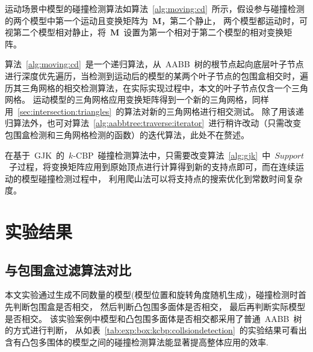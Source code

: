\begin{algorithm}[htb]
\end{algorithm}

运动场景中模型的碰撞检测算法如算法~\ref{alg:moving:cd}~所示，假设参与碰撞检测的两个模型中第一个运动且变换矩阵为~$\bm{M}$，第二个静止，
两个模型都运动时，可视第二个模型相对静止，将~$\bm{M}$~设置为第一个相对于第二个模型的相对变换矩阵。

算法~\ref{alg:moving:cd}~是一个递归算法，从~AABB~树的根节点起向底层叶子节点进行深度优先遍历，当检测到运动后的模型的某两个叶子节点的包围盒相交时，遍历其三角网格的相交检测算法，在实际实现过程中，本文的叶子节点仅含一个三角网格。
运动模型的三角网格应用变换矩阵得到一个新的三角网格，同样用~\ref{sec:intersection:triangles}~的算法对新的三角网格进行相交测试。
除了用该递归算法外，也可对算法~\ref{alg:aabbtree:traverse:iterator}~进行稍许改动（只需改变包围盒检测和三角网格检测的函数）的迭代算法，此处不在赘述。

在基于~GJK~的~$k$-CBP~碰撞检测算法中，只需要改变算法~\ref{alg:gjk}~中~$Support$~子过程，将变换矩阵应用到原始顶点进行计算得到新的支持点即可，而在连续运动的模型碰撞检测过程中，
利用爬山法可以将支持点的搜索优化到常数时间复杂度\cite{bergen1999fast}。


\section{实验结果}
\label{sec:exper-cd}

\subsection{与包围盒过滤算法对比}
\label{subsec:exper:box:kcbp}

本文实验通过生成不同数量的模型(模型位置和旋转角度随机生成)，碰撞检测时首先判断包围盒是否相交， 然后判断凸包围多面体是否相交， 最后再判断实际模型是否相交。
该实验案例中模型和凸包围多面体是否相交都采用了普通~AABB~树的方式进行判断，
从如表~\ref{tab:exp:box:kcbp:collsiondetection}~的实验结果可看出含有凸包多围体的模型之间的碰撞检测算法能显著提高整体应用的效率. 

